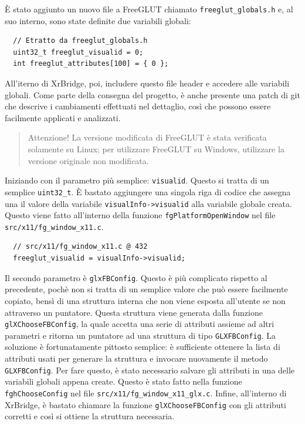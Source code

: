 \documentclass[twoside]{supsistudent}
\begin{document}
È stato aggiunto un nuovo file a FreeGLUT chiamato \texttt{freeglut\_globals.h} e, al suo interno, sono state definite due variabili globali:

\begin{verbatim}
  // Etratto da freeglut_globals.h
  uint32_t freeglut_visualid = 0;
  int freeglut_attributes[100] = { 0 };
\end{verbatim}

All'iterno di XrBridge, poi, includere questo file header e accedere alle variabili globali. Come parte della consegna del progetto, è anche presente una patch di git che descrive i cambiamenti effettuati nel dettaglio, così che possono essere facilmente applicati e analizzati.

\begin{quote}
  Attenzione! La versione modificata di FreeGLUT è stata verificata solamente su Linux; per utilizzare FreeGLUT su Windows, utilizzare la versione originale non modificata.
\end{quote}

Iniziando con il parametro più semplice: \texttt{visualid}. Questo si tratta di un semplice \texttt{uint32\_t}. È bastato aggiungere una singola riga di codice che assegna una il valore della variabile \texttt{visualInfo->visualid} alla variabile globale creata. Questo viene fatto all'interno della funzione \texttt{fgPlatformOpenWindow} nel file \texttt{src/x11/fg\_window\_x11.c}.

\begin{verbatim}
  // src/x11/fg_window_x11.c @ 432
  freeglut_visualid = visualInfo->visualid;
\end{verbatim}

Il secondo parametro è \texttt{glxFBConfig}. Questo è più complicato rispetto al precedente, pochè non si tratta di un semplice valore che può essere facilmente copiato, bensì di una struttura interna che non viene esposta all'utente se non attraverso un puntatore. Questa struttura viene generata dalla funzione \texttt{glXChooseFBConfig}, la quale accetta una serie di attributi assieme ad altri parametri e ritorna un puntatore ad una struttura di tipo \texttt{GLXFBConfig}. La soluzione è fortunatamente pittosto semplice: è sufficiente ottenere la lista di attributi usati per generare la struttura e invocare nuovamente il metodo \texttt{GLXFBConfig}. Per fare questo, è stato necessario salvare gli attributi in una delle variabili globali appena create. Questo è stato fatto nella funzione \texttt{fghChooseConfig} nel file \texttt{src/x11/fg\_window\_x11\_glx.c}. Infine, all'interno di XrBridge, è bastato chiamare la funzione \texttt{glXChooseFBConfig} con gli attributi corretti e così si ottiene la struttura necessaria.
\end{document}
